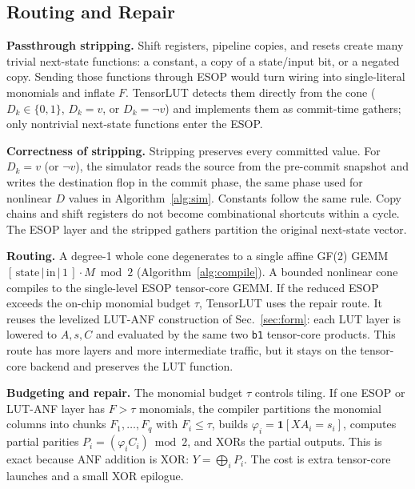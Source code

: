 \documentclass[sigconf]{acmart}
\begin{document}
\subsection{Routing and Repair}
\textbf{Passthrough stripping.} Shift registers, pipeline copies, and resets create many trivial
next-state functions: a constant, a copy of a state/input bit, or a negated copy. Sending those
functions through ESOP would turn wiring into single-literal monomials and inflate $F$. TensorLUT
detects them directly from the cone ($D_k\in\{0,1\}$, $D_k=v$, or $D_k=\lnot v$) and implements
them as commit-time gathers; only nontrivial next-state functions enter the ESOP.

\textbf{Correctness of stripping.} Stripping preserves every committed value. For $D_k=v$ (or $\lnot v$), the simulator reads the source from the pre-commit snapshot
and writes the destination flop in the commit phase, the same phase used for nonlinear $D$ values in
Algorithm~\ref{alg:sim}. Constants follow the same rule. Copy chains and shift registers
do not become combinational shortcuts within a cycle. The ESOP layer and the stripped gathers
partition the original next-state vector.

\textbf{Routing.} A degree-1 whole cone degenerates to a single affine GF(2) GEMM
$[\,\text{state}\,|\,\text{in}\,|\,1\,]\!\cdot\!M \bmod 2$ (Algorithm~\ref{alg:compile}). A bounded
nonlinear cone compiles to the single-level ESOP tensor-core GEMM. If the reduced ESOP exceeds the
on-chip monomial budget $\tau$, TensorLUT uses the repair route. It reuses the levelized LUT-ANF
construction of Sec.~\ref{sec:form}: each LUT layer is lowered to $A,s,C$ and evaluated by the same
two \texttt{b1} tensor-core products. This route has more layers and more intermediate traffic, but
it stays on the tensor-core backend and preserves the LUT function.

\textbf{Budgeting and repair.} The monomial budget $\tau$ controls tiling. If one ESOP or LUT-ANF
layer has $F>\tau$ monomials, the compiler partitions the monomial columns into chunks
$F_1,\ldots,F_q$ with $F_i\le\tau$, builds
$\varphi_i=\mathbf{1}[X A_i=s_i]$, computes partial parities $P_i=(\varphi_i C_i)\bmod2$, and
XORs the partial outputs. This is exact because ANF addition is XOR:
$Y=\bigoplus_i P_i$. The cost is extra tensor-core launches and a small XOR epilogue.
\end{document}
